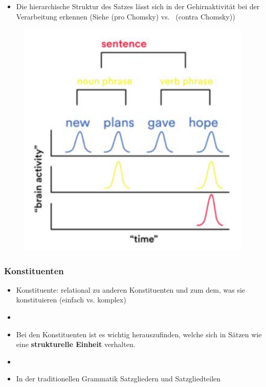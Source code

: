 \begin{frame}

\begin{itemize}
	\item Die hierarchische Struktur des Satzes lässt sich in der Gehirnaktivität bei der Verarbeitung erkennen (Siehe \citealt{Devitt15a} (pro Chomsky) vs.\ \citealt{Boutonnet15a} (contra Chomsky))	
\end{itemize}

\begin{figure}
\centering
	\includegraphics[scale=.33]{material/10gehirnaktivitaet}
	\caption{\citep[Quelle:][]{Boutonnet15a}}
\end{figure}

\end{frame}


\begin{frame}
\frametitle{Konstituenten}

\begin{itemize}
	\item Konstituente: relational zu anderen Konstituenten und zum dem, was sie konstituieren (\ras einfach vs. komplex)
	\item[]
	\item Bei den Konstituenten ist es wichtig herauszufinden, welche sich in Sätzen wie eine \textbf{strukturelle Einheit} verhalten.
	\item[]
	\item In der traditionellen Grammatik \ras Satzgliedern und Satzgliedteilen

\end{itemize}

\end{frame}


